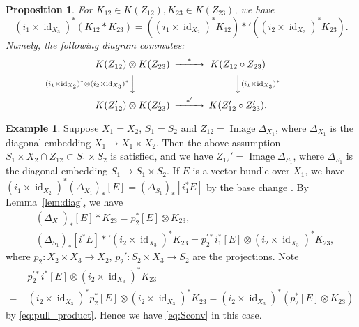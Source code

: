 \documentclass[12pt]{amsart}
\newtheorem{Proposition}[equation]{Proposition}
\theoremstyle{definition}
\newtheorem{Example}[equation]{Example}
\theoremstyle{remark}
\numberwithin{equation}{subsection}
\newcommand{\lemref}[1]{Lemma~\ref{#1}}
\newcommand{\id}{\operatorname{id}}
\newcommand{\shfO}{\mathcal O}
\begin{document}
\begin{Proposition}\label{prop:Sconv}
For $K_{12}\in K(Z_{12}), K_{23}\in K(Z_{23})$, we have
\begin{equation}\label{eq:Sconv}
  (i_1\times \id_{X_3})^*(K_{12} * K_{23})
  = \left((i_1\times\id_{X_2})^*K_{12}\right) *'
  \left((i_2\times\id_{X_3})^* K_{23}\right).
\end{equation}
Namely, the following diagram commutes:
\begin{equation*}
\begin{CD}
  K(Z_{12})\otimes K(Z_{23}) @>{*}>> K(Z_{12}\circ Z_{23}) \\
  @V{(i_1\times\id_{X_2})^* \otimes (i_2\times\id_{X_3})^*}VV
  @VV{(i_1\times\id_{X_3})^*}V \\
  K(Z'_{12})\otimes K(Z'_{23}) @>{*'}>> K(Z'_{12}\circ Z'_{23}).
\end{CD}
\end{equation*}
\end{Proposition}

\begin{Example}
Suppose $X_1 = X_2$, $S_1 = S_2$ and $Z_{12} =
\operatorname{Image}\Delta_{X_1}$, where $\Delta_{X_1}$ is the
diagonal embedding $X_1\to X_1\times X_2$. Then the above assumption
$S_1\times X_2 \cap Z_{12} \subset S_1\times S_2$ is satisfied, and we
have $Z_{12}' = \operatorname{Image}\Delta_{S_1}$, where
$\Delta_{S_1}$ is the diagonal embedding $S_1\to S_1\times S_2$.
If $E$ is a vector bundle over $X_1$, we have
\(
  (i_1\times\id_{X_2})^*(\Delta_{X_1})_*[E]
   = (\Delta_{S_1})_*[i_1^* E]
\)
by the base change \cite[5.3.15]{Gi-book}.
By \lemref{lem:diag}, we have 
\begin{equation*}
\begin{split}
  & (\Delta_{X_1})_*[E] * K_{23} = p_2^* [E] \otimes K_{23},\\
  & (\Delta_{S_1})_*[i^* E] *' (i_2\times\id_{X_3})^* K_{23}
  = p_2^{\prime*}i_1^* [E] \otimes
   (i_2\times\id_{X_3})^* K_{23},
\end{split}
\end{equation*}
where $p_2\colon X_2\times X_3\to X_2$,
$p_2'\colon S_2\times X_3\to S_2$
are the projections. Note
\begin{equation*}
\begin{split}
  & p_2^{\prime*}i^* [E] \otimes
  (i_2\times\id_{X_3})^* K_{23} \\
 =\; & (i_2\times\id_{X_3})^* p_2^* [E] \otimes
  (i_2\times\id_{X_3})^* K_{23}
 = (i_2\times\id_{X_3})^*\left(p_2^*[E]\otimes
  K_{23}\right)
\end{split}
\end{equation*}
by \eqref{eq:pull_product}.
Hence we have \eqref{eq:Sconv} in this case.
\end{Example}
\end{document}

